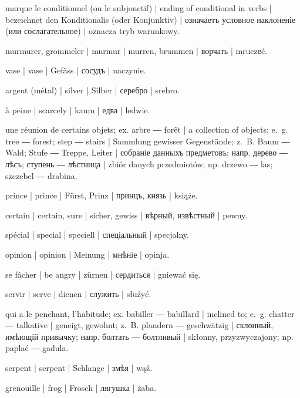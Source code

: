 \begin{ekzvocab}{1em}
 marque le conditionnel (ou le subjonctif) | ending of conditional in verbs | bezeichnet den Konditionalis (oder Konjunktiv) | означаетъ условное наклоненіе (или сослагательное) | oznacza tryb warunkowy.

 murmurer, grommeler | murmur | murren, brummen | ворчать | mruczеć.

 vase | vase | Gefäss | сосудъ | naczynie.

 argent (métal) | silver | Silber | серебро | srebro.

 à peine | scarcely | kaum | едва | ledwie.

 une réunion de certains objets; ex.  arbre ―  forêt | a collection of objects; e.~g.  tree ―  forest;  step ―  stairs | Sammlung gewisser Gegenstände; z.~B.  Baum ―  Wald;  Stufe ―  Treppe, Leiter | собраніе данныхъ предметовъ; напр.  дерево ―  лѣсъ;  ступень ―  лѣстница | zbiór danych przedmiotów; np.  drzewo ―  las;  szczebel ―  drabina.

 prince | prince | Fürst, Prinz | принцъ, князь | książe.

 certain | certain, sure | sicher, gewiss | вѣрный, извѣстный | pewny.

 spécial | special | speciell | спеціальный | specjalny.

 opinion | opinion | Meinung | мнѣніе | opinja.

 se fâcher | be angry | zürnen | сердиться | gniewać się.

 servir | serve | dienen | служить | słuźyć.

 qui a le penchant, l’habitude; ex.  babiller ―  babillard | inclined to; e.~g.  chatter ―  talkative | geneigt, gewohnt; z.~B.  plaudern ―  geschwätzig | склонный, имѣющій привычку; напр.  болтать ―  болтливый | skłonny, przyzwyczajony; np.  paplać ―  gadula.

 serpent | serpent | Schlange | змѣя | wąź.

 grenouille | frog | Frosch | лягушка | żaba.

\end{ekzvocab}



